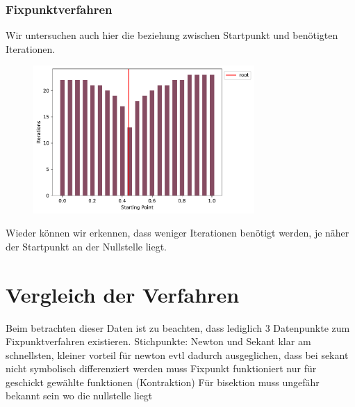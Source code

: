 \documentclass[a4paper,12pt]{article}
\newcommand{\1}{1\hspace{-0,9ex}1}
\begin{document}
\subsubsection*{Fixpunktverfahren}
Wir untersuchen auch hier die beziehung zwischen Startpunkt und benötigten Iterationen.
\begin{figure}[!h]
	\centering
	\includegraphics[width=0.75\textwidth]{plots/fixed_point_iterations_by_starting_point.pdf}
\end{figure}
Wieder können wir erkennen, dass weniger Iterationen benötigt werden, je näher der Startpunkt an der Nullstelle liegt.
\section*{Vergleich der Verfahren}
Beim betrachten dieser Daten ist zu beachten, dass lediglich 3 Datenpunkte zum Fixpunktverfahren existieren.
Stichpunkte:
Newton und Sekant klar am schnellsten, kleiner vorteil für newton evtl dadurch ausgeglichen, dass bei sekant nicht symbolisch differenziert werden muss
Fixpunkt funktioniert nur für geschickt gewählte funktionen (Kontraktion)
Für bisektion muss ungefähr bekannt sein wo die nullstelle liegt
\end{document}
